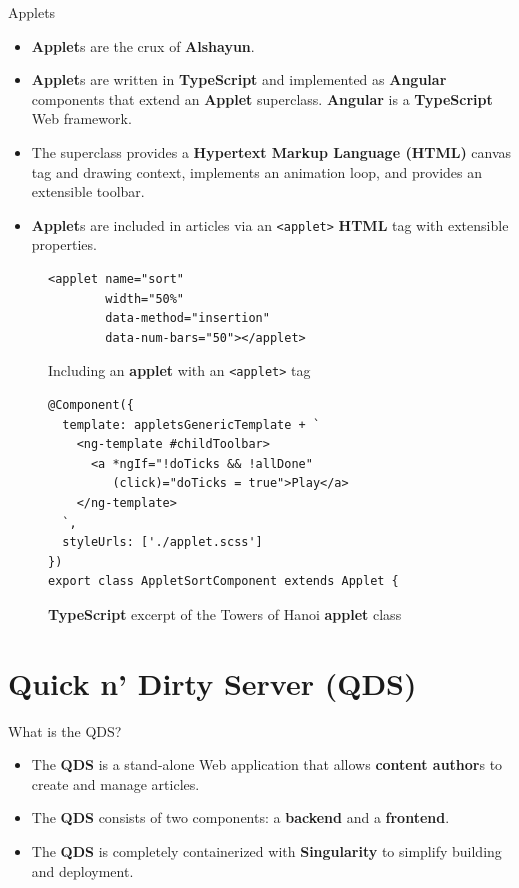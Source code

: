 \documentclass{beamer}
\begin{document}
\begin{frame}{Applets}
    \begin{itemize}
        \item \textbf{Applet}s are the crux of \textbf{Alshayun}.
        \item \textbf{Applet}s are written in \textbf{TypeScript} and
            implemented as \textbf{Angular} components that extend an
            \textbf{Applet} superclass. \textbf{Angular} is a
            \textbf{TypeScript} Web framework.
        \item The superclass provides a \textbf{Hypertext Markup Language
            (HTML)} canvas tag and drawing context, implements an animation
            loop, and provides an extensible toolbar.
        \item \textbf{Applet}s are included in articles via an \texttt{<applet>}
            \textbf{HTML} tag with extensible properties.
    \end{itemize}
    \begin{figure}
    \begin{verbatim}
<applet name="sort"
        width="50%"
        data-method="insertion"
        data-num-bars="50"></applet>
    \end{verbatim}
        \caption{Including an \textbf{applet} with an \texttt{<applet>} tag}
    \end{figure}
    \begin{figure}
    \begin{verbatim}
@Component({
  template: appletsGenericTemplate + `
    <ng-template #childToolbar>
      <a *ngIf="!doTicks && !allDone"
         (click)="doTicks = true">Play</a>
    </ng-template>
  `,
  styleUrls: ['./applet.scss']
})
export class AppletSortComponent extends Applet {
    \end{verbatim}
        \caption{\textbf{TypeScript} excerpt of the Towers of Hanoi
        \textbf{applet} class}
    \end{figure}
\end{frame}

\section{Quick n' Dirty Server (QDS)}

\begin{frame}{What is the QDS?}
    \begin{itemize}
        \item The \textbf{QDS} is a stand-alone Web application that allows
            \textbf{content author}s to create and manage articles.
        \item The \textbf{QDS} consists of two components: a \textbf{backend}
            and a \textbf{frontend}.
        \item The \textbf{QDS} is completely containerized with
            \textbf{Singularity} to simplify building and deployment.
    \end{itemize}
\end{frame}
\end{document}
